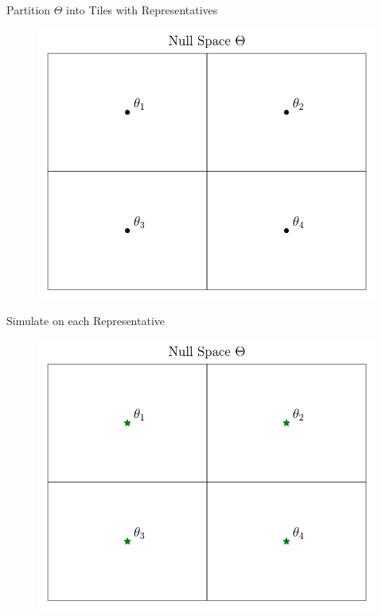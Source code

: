 \begin{frame}{Partition $\Theta$ into Tiles with Representatives}
\begin{figure}
    \centering
    \includegraphics[width=0.95\linewidth]{figs/approach_2.pdf}
\end{figure} 
\end{frame}

\begin{frame}{Simulate on each Representative}
\begin{figure}
    \centering
    \includegraphics[width=0.95\linewidth]{figs/approach_3.pdf}
\end{figure} 
\end{frame}

